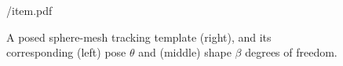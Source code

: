 \begin{figure}[t]
\centering
\begin{overpic} 
[width=\linewidth]
{\currfiledir/item.pdf}
\myfigurename{}
\end{overpic}
\caption{
% 
A posed sphere-mesh tracking template (right), and its corresponding (left) pose $\theta$ and (middle) shape $\beta$ degrees of freedom. 
% 
}
\label{fig:handmodel}
\end{figure}
